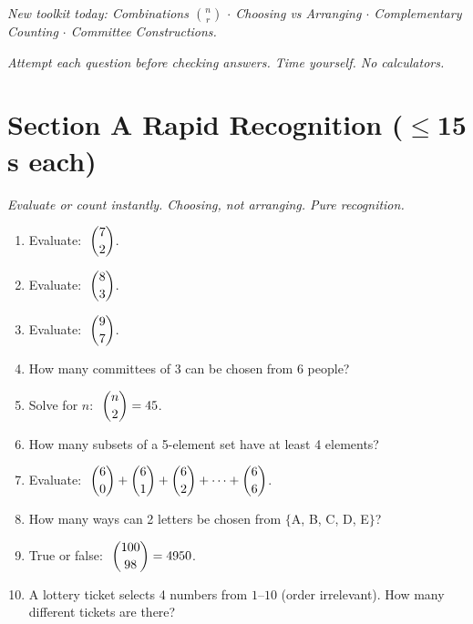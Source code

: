\documentclass[11pt,a4paper]{article}
\begin{document}
\noindent\textit{New toolkit today: Combinations $\binom{n}{r}$ $\cdot$ Choosing vs Arranging $\cdot$ Complementary Counting $\cdot$ Committee Constructions.}

\vspace{2pt}
\noindent\textit{Attempt each question before checking answers. Time yourself. No calculators.}

\section*{Section A \quad Rapid Recognition \hfill{\normalfont\small($\leq$15 s each)}}

\noindent\textit{Evaluate or count instantly. Choosing, not arranging. Pure recognition.}

\begin{enumerate}

\item Evaluate: $\;\dbinom{7}{2}$.

\item Evaluate: $\;\dbinom{8}{3}$.

\item Evaluate: $\;\dbinom{9}{7}$.

\item How many committees of 3 can be chosen from 6 people?

\item Solve for $n$: $\;\dbinom{n}{2}=45$.

\item How many subsets of a 5-element set have at least 4 elements?

\item Evaluate: $\;\dbinom{6}{0}+\dbinom{6}{1}+\dbinom{6}{2}+\cdots+\dbinom{6}{6}$.

\item How many ways can 2 letters be chosen from $\{$A, B, C, D, E$\}$?

\item True or false: $\;\dbinom{100}{98}=4950$.

\item A lottery ticket selects 4 numbers from $1$--$10$ (order irrelevant). How many different tickets are there?

\end{enumerate}
\end{document}
